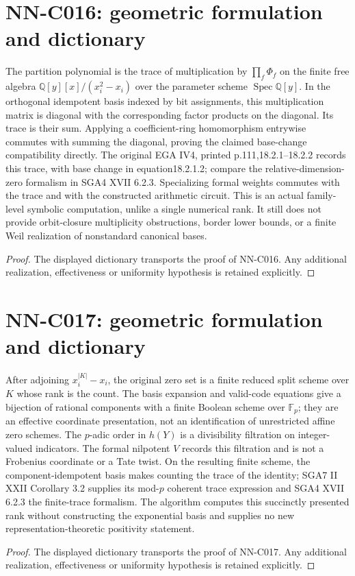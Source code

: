\section{NN-C016: geometric formulation and dictionary}
\begin{geometricstatement}[NN-C016]
The partition polynomial is the trace of multiplication by $\prod_f\Phi_f$ on the finite free algebra $\mathbb Q[y][x]/(x_i^2-x_i)$ over the parameter scheme $\operatorname{Spec}\mathbb Q[y]$. In the orthogonal idempotent basis indexed by bit assignments, this multiplication matrix is diagonal with the corresponding factor products on the diagonal. Its trace is their sum. Applying a coefficient-ring homomorphism entrywise commutes with summing the diagonal, proving the claimed base-change compatibility directly. The original EGA IV4, printed p.111,18.2.1--18.2.2 records this trace, with base change in equation18.2.1.2; compare the relative-dimension-zero formalism in SGA4 XVII 6.2.3. Specializing formal weights commutes with the trace and with the constructed arithmetic circuit. This is an actual family-level symbolic computation, unlike a single numerical rank. It still does not provide orbit-closure multiplicity obstructions, border lower bounds, or a finite Weil realization of nonstandard canonical bases.
\end{geometricstatement}
\begin{proof} The displayed dictionary transports the proof of NN-C016. Any additional realization, effectiveness or uniformity hypothesis is retained explicitly.\end{proof}


\section{NN-C017: geometric formulation and dictionary}
\begin{geometricstatement}[NN-C017]
After adjoining $x_i^{|K|}-x_i$, the original zero set is a finite reduced split scheme over $K$ whose rank is the count. The basis expansion and valid-code equations give a bijection of rational components with a finite Boolean scheme over $\mathbb F_p$; they are an effective coordinate presentation, not an identification of unrestricted affine zero schemes. The $p$-adic order in $h(Y)$ is a divisibility filtration on integer-valued indicators. The formal nilpotent $V$ records this filtration and is not a Frobenius coordinate or a Tate twist. On the resulting finite scheme, the component-idempotent basis makes counting the trace of the identity; SGA7 II XXII Corollary 3.2 supplies its mod-$p$ coherent trace expression and SGA4 XVII 6.2.3 the finite-trace formalism. The algorithm computes this succinctly presented rank without constructing the exponential basis and supplies no new representation-theoretic positivity statement.
\end{geometricstatement}
\begin{proof} The displayed dictionary transports the proof of NN-C017. Any additional realization, effectiveness or uniformity hypothesis is retained explicitly.\end{proof}


